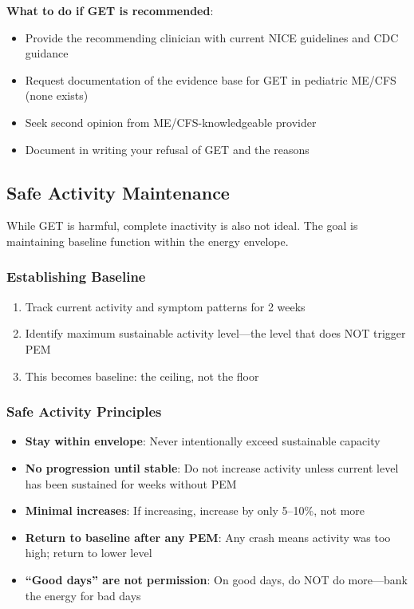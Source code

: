 \begin{practicalwarning}
\textbf{What to do if GET is recommended}:
\begin{itemize}
    \item Provide the recommending clinician with current NICE guidelines and CDC guidance
    \item Request documentation of the evidence base for GET in pediatric ME/CFS (none exists)
    \item Seek second opinion from ME/CFS-knowledgeable provider
    \item Document in writing your refusal of GET and the reasons
\end{itemize}
\end{practicalwarning}

\subsection{Safe Activity Maintenance}
\label{subsec:ped-safe-activity}

While GET is harmful, complete inactivity is also not ideal. The goal is maintaining baseline function within the energy envelope.

\subsubsection{Establishing Baseline}

\begin{enumerate}
    \item Track current activity and symptom patterns for 2 weeks
    \item Identify maximum sustainable activity level---the level that does NOT trigger PEM
    \item This becomes baseline: the ceiling, not the floor
\end{enumerate}

\subsubsection{Safe Activity Principles}

\begin{itemize}
    \item \textbf{Stay within envelope}: Never intentionally exceed sustainable capacity
    \item \textbf{No progression until stable}: Do not increase activity unless current level has been sustained for weeks without PEM
    \item \textbf{Minimal increases}: If increasing, increase by only 5--10\%, not more
    \item \textbf{Return to baseline after any PEM}: Any crash means activity was too high; return to lower level
    \item \textbf{``Good days'' are not permission}: On good days, do NOT do more---bank the energy for bad days
\end{itemize}


